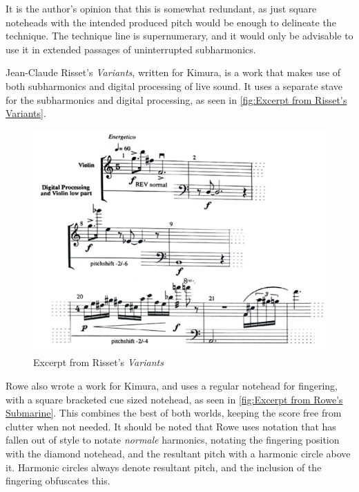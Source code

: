 It is the author's opinion that this is somewhat redundant, as just square noteheads with the intended produced pitch would be enough to delineate the technique. 
The technique line is supernumerary, and it would only be advisable to use it in extended passages of uninterrupted subharmonics.


Jean-Claude Risset's \emph{Variants}, written for Kimura, is a work that makes use of both subharmonics and digital processing of live sound.\autocite[]{rissetVariants1995}
It uses a separate stave for the subharmonics and digital processing, as seen in \autoref{fig:Excerpt from Risset's Variants}. 

\begin{figure}
  \includegraphics[width=\linewidth]{./resources/rissetALFExcerpt.pdf}
  \caption{Excerpt from Risset's \emph{Variants}}
\label{fig:Excerpt from Risset's Variants}
\end{figure}

Rowe also wrote a work for Kimura, and uses a regular notehead for fingering, with a square bracketed cue sized notehead, as seen in \autoref{fig:Excerpt from Rowe's Submarine}.\autocite[]{roweSubmarine1996}
This combines the best of both worlds, keeping the score free from clutter when not needed.
It should be noted that Rowe uses notation that has fallen out of style to notate \emph{normale} harmonics, notating the fingering position with the diamond notehead, and the resultant pitch with a harmonic circle above it. 
Harmonic circles always denote resultant pitch, and the inclusion of the fingering obfuscates this.\autocite[420]{gouldBars2011}


